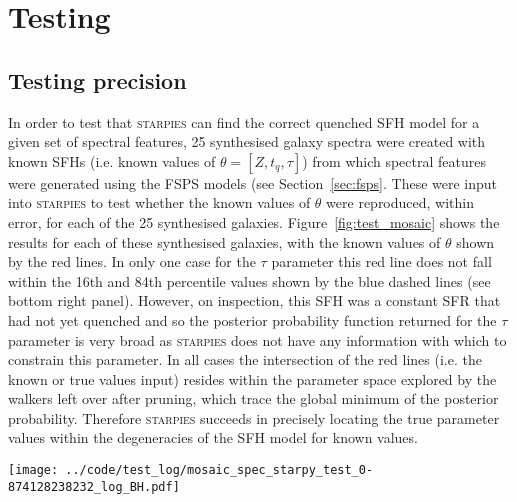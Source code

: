 \documentclass[useAMS,usenatbib]{mn2e}
\def\check		{\color{check}}
\begin{document}
\section{Testing}\label{sec:test}

\subsection{Testing precision}

In order to test that \textsc{starpies} can find the correct quenched SFH model for a given set of spectral features, 25 synthesised galaxy spectra were created with known SFHs (i.e. known values of $\theta = [Z, t_q, \tau]$) from which spectral features were generated using the FSPS models (see Section~\ref{sec:fsps}. These were input into \textsc{starpies} to test whether the known values of $\theta$ were reproduced, within error, for each of the 25 synthesised galaxies. Figure~\ref{fig:test_mosaic} shows the results for each of these synthesised galaxies, with the known values of $\theta$ shown by the red lines. In only one case for the $\tau$ parameter this red line does not fall within the 16th and 84th percentile values shown by the blue dashed lines (see bottom right panel). However, on inspection, this SFH was a constant SFR that had not yet quenched and so the posterior probability function returned for the $\tau$ parameter is very broad as \textsc{starpies} does not have any information with which to constrain this parameter. In all cases the intersection of the red lines (i.e. the known or true values input) resides within the parameter space explored by the walkers left over after pruning, which trace the global minimum of the posterior probability. Therefore \textsc{starpies} succeeds in precisely locating the true parameter values within the degeneracies of the SFH model for known values. 

\begin{figure*}
\centering
\texttt{[image: ../code/test\_log/mosaic\_spec\_starpy\_test\_0-874128238232\_log\_BH.pdf]}
\caption{Results from \textsc{starpies} for an array of synthesised galaxies with known true $[Z, t_q, \tau]$ values (marked by the solid red lines) assuming an error on the input spectral measurements of the average error on the measured MaNGA spectra measurements. {\check Pruning has been applied?} In each case \textsc{starpies} has succeeded in locating the true parameter values within the degeneracies of the star formation history model.}
\label{fig:test_mosaic}
\end{figure*}
\end{document}

